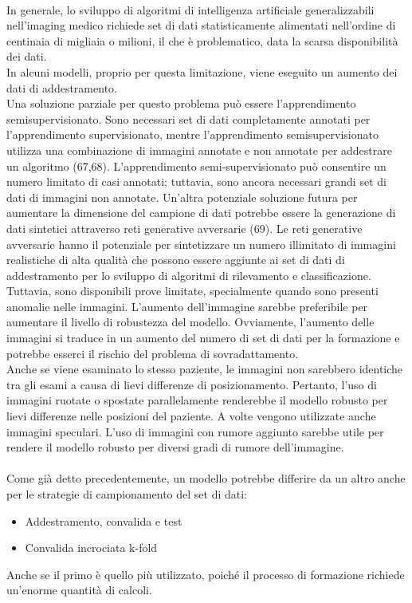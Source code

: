 \documentclass[12pt,a4paper]{report}
\begin{document}
\\
In generale, lo sviluppo di algoritmi di intelligenza artificiale generalizzabili nell'imaging medico richiede set di dati statisticamente alimentati nell'ordine di centinaia di migliaia o milioni, il che è problematico, data la scarsa disponibilità
dei dati.\\
In alcuni modelli, proprio per questa limitazione, viene eseguito un aumento dei dati di addestramento.\\
Una soluzione parziale per questo problema può essere l'apprendimento semisupervisionato. Sono necessari
set di dati completamente annotati per l'apprendimento supervisionato, mentre l'apprendimento semisupervisionato
utilizza una combinazione di immagini annotate e non annotate per addestrare un algoritmo (67,68).
L'apprendimento semi-supervisionato può consentire un numero limitato di casi annotati; tuttavia, sono ancora 
necessari grandi set di dati di immagini non annotate.
Un'altra potenziale soluzione futura per aumentare la dimensione del campione di dati potrebbe essere la generazione di dati 
sintetici attraverso reti generative avversarie (69). Le reti generative avversarie hanno il potenziale per sintetizzare un numero
illimitato di immagini realistiche di alta qualità che possono essere aggiunte ai set di dati di addestramento per lo sviluppo di 
algoritmi di rilevamento e classificazione. Tuttavia, sono disponibili prove limitate, specialmente quando sono presenti anomalie nelle immagini.
L'aumento dell'immagine sarebbe preferibile per aumentare il livello di robustezza del modello. Ovviamente, l'aumento delle immagini si traduce in un aumento del numero di set di dati per la formazione e potrebbe esserci il rischio del problema di sovradattamento.\\
Anche se viene esaminato lo stesso paziente, le immagini non sarebbero identiche tra gli esami a causa di lievi differenze di posizionamento. 
Pertanto, l'uso di immagini ruotate o spostate parallelamente renderebbe il modello robusto per lievi differenze nelle posizioni del paziente. A volte vengono utilizzate anche immagini speculari. L'uso di immagini con rumore aggiunto sarebbe utile per rendere il modello robusto per diversi gradi di rumore dell'immagine.\\
\\
Come già detto precedentemente, un modello potrebbe differire da un altro anche per le strategie di campionamento del set di dati:
\begin{itemize}
    \item Addestramento, convalida e test
    \item Convalida incrociata k-fold
\end{itemize}
Anche se il primo è quello più utilizzato, poiché il processo di formazione richiede un'enorme quantità di calcoli.\\
\end{document}
